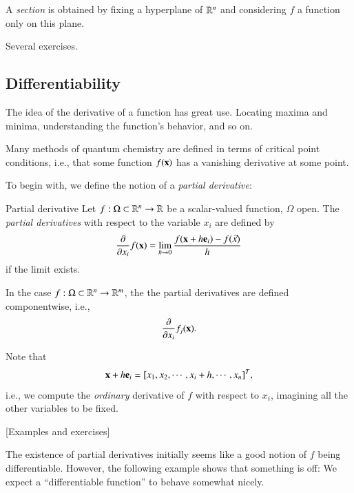 A \emph{section} is obtained by fixing a hyperplane of $\mathbb{R}^n$ and considering $f$ a function only on this plane.

Several exercises.



\subsection{Differentiability}
\label{sec:differentiability}

The idea of the derivative of a function has great use. Locating maxima and minima, understanding the function's behavior, and so on.

Many methods of quantum chemistry are defined in terms of critical point conditions, i.e., that some function $f(\mathbf{x})$ has a vanishing derivative at some point.

To begin with, we define the notion of a \emph{partial derivative}:

\begin{myDefinition}{Partial derivative}{}
Let $f : \Omega\subset\mathbb{R}^n \to \mathbb{R}$ be a scalar-valued function, $\Omega$ open. The \emph{partial derivatives} with respect to the variable $x_i$ are defined by
\begin{equation}
    \frac{\partial }{\partial x_i} f(\mathbf{x}) = \lim_{h\to 0} \frac{f(\mathbf{x} + h\mathbf{e}_i) - f(\vec{x}) }{h}
\end{equation}
if the limit exists. 

In the case $f : \Omega\subset\mathbb{R}^n \to \mathbb{R}^m$, the the partial derivatives are defined componentwise, i.e.,
\begin{equation}
    \frac{\partial }{\partial x_i} f_j(\mathbf{x}).
\end{equation}
\end{myDefinition}

Note that
\begin{equation}
    \mathbf{x}+ h \mathbf{e}_i = [x_1,x_2,\cdots,x_i+h,\cdots,x_n]^T,
\end{equation}
i.e., we compute the \emph{ordinary} derivative of $f$ with respect to $x_i$, imagining all the other variables to be fixed.

[Examples and exercises]

The existence of partial derivatives initially seems like a good notion of $f$ being differentiable. However, the following example shows that something is off: We expect a ``differentiable function'' to behave somewhat nicely. 

